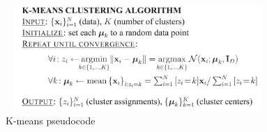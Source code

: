 \documentclass[../UNBThesis2.tex]{subfiles}
\begin{document}
\begin{figure}
\centering
\includegraphics[width = 10cm,height = 4cm]{image/Chapters/Chapter2/6.png}
\caption{K-means pseudocode }
\label{kmAlgo}
\end{figure}






\end{document}
